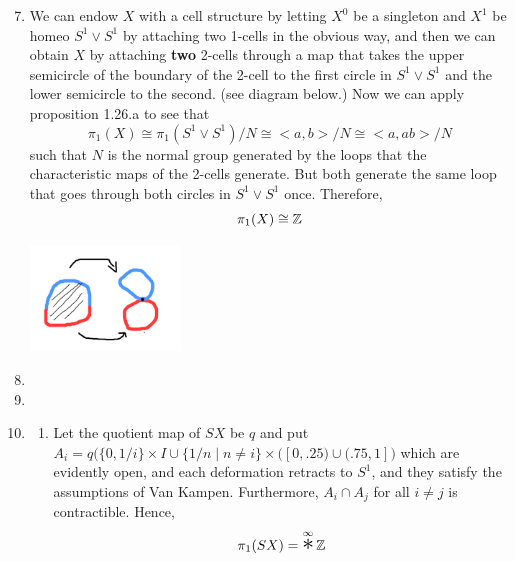 \documentclass{article}
\begin{document}
\maketitle

\pagebreak 

\begin{homeworkProblem}
    \begin{enumerate}[label=1.2.\arabic*]
        \setcounter{enumi}{6}
        \item We can endow $X$ with a cell structure by letting $X^0$ be a singleton and $X^1$ be homeo $S^1 \vee S^1$ by attaching two 1-cells in the obvious way, and then we can obtain $X$ by attaching \textbf{two} 2-cells through a map that takes the upper semicircle of the boundary of the 2-cell to the first circle in $S^1 \vee S^1$ and the lower semicircle to the second. (see diagram below.) Now we can apply proposition 1.26.a to see that
        \[\pi_1(X) \cong \pi_1(S^1 \vee S^1)/N \cong <a, b>/N \cong <a, ab>/N\]
        such that $N$ is the normal group generated by the loops that the characteristic maps of the 2-cells generate. But both generate the same loop that goes through both circles in $S^1 \vee S^1$ once. Therefore,
        \[\pi_1(X) \cong \mathbb{Z}\]
        
        \includegraphics[width=4cm]{cell attachment.png}
        \setcounter{enumi}{8}
        \item 

        \setcounter{enumi}{16}
        \item 
        \item \begin{enumerate}[label=(\alph*)]
            \item Let the quotient map of $SX$ be $q$ and put $A_i = q\bigl(\{0, 1/i\} \times I \cup \{1/n \mid n \neq i\} \times ([0, .25) \cup (.75, 1]\bigr)$ which are evidently open, and each deformation retracts to $S^1$, and they satisfy the assumptions of Van Kampen. Furthermore, $A_i \cap A_j$ for all $i \neq j$ is contractible. Hence,
            \[\pi_1(SX) = \bigast^\i \bZ\]
        \end{enumerate}
    \end{enumerate}
\end{homeworkProblem}
\end{document}
